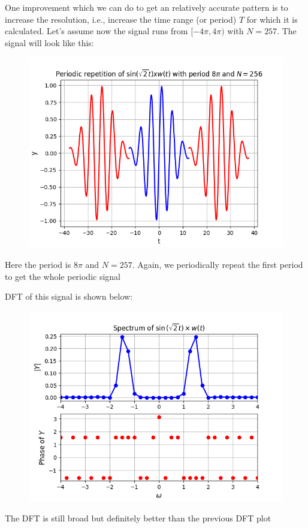 \documentclass[12pt, a4paper]{article}
\begin{document}
One improvement which we can do to get an relatively accurate pattern is to increase the resolution, i.e., increase the time range (or period) $T$ for which it is calculated. Let's assume now the signal runs from $[-4\pi,4\pi)$ with $N=257$. The signal will look like this:
\vspace*{-0.5cm}
\begin{figure}[H]
    \centering
    \includegraphics[scale = 0.75]{Figure_7.png}
    \label{fig:sample}
\end{figure}
\begin{center}
    Here the period is $8\pi$ and $N=257$. Again, we periodically repeat the first period to get the whole periodic signal
\end{center}
DFT of this signal is shown below:
\begin{figure}[H]
    \centering
    \includegraphics[scale = 0.8]{Figure_8.png}
    \label{fig:sample}
\end{figure}
\begin{center}
    The DFT is still broad but definitely better than the previous DFT plot
\end{center}
\end{document}
